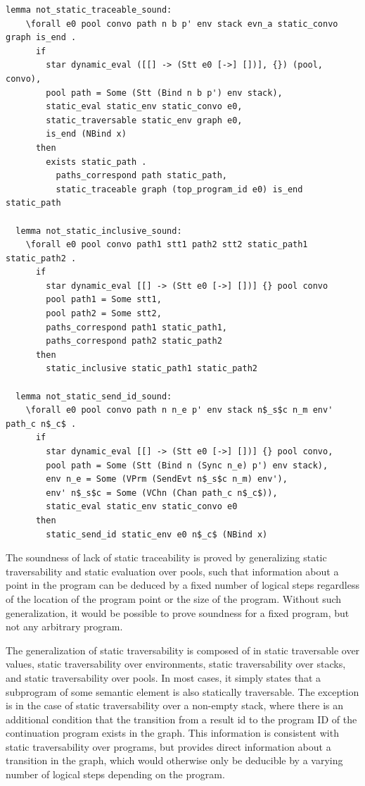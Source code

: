\documentclass[10pt]{article}
\begin{document}
\begin{lstlisting}[language=logic, mathescape]
  lemma not_static_traceable_sound:
    \forall e0 pool convo path n b p' env stack evn_a static_convo graph is_end .
      if
        star dynamic_eval ([[] -> (Stt e0 [->] [])], {}) (pool, convo), 
        pool path = Some (Stt (Bind n b p') env stack),
        static_eval static_env static_convo e0,
        static_traversable static_env graph e0,
        is_end (NBind x)
      then
        exists static_path . 
          paths_correspond path static_path, 
          static_traceable graph (top_program_id e0) is_end static_path

  lemma not_static_inclusive_sound:
    \forall e0 pool convo path1 stt1 path2 stt2 static_path1 static_path2 . 
      if
        star dynamic_eval [[] -> (Stt e0 [->] [])] {} pool convo
        pool path1 = Some stt1, 
        pool path2 = Some stt2, 
        paths_correspond path1 static_path1, 
        paths_correspond path2 static_path2
      then
        static_inclusive static_path1 static_path2

  lemma not_static_send_id_sound:
    \forall e0 pool convo path n n_e p' env stack n$_s$c n_m env' path_c n$_c$ .
      if
        star dynamic_eval [[] -> (Stt e0 [->] [])] {} pool convo, 
        pool path = Some (Stt (Bind n (Sync n_e) p') env stack), 
        env n_e = Some (VPrm (SendEvt n$_s$c n_m) env'), 
        env' n$_s$c = Some (VChn (Chan path_c n$_c$)), 
        static_eval static_env static_convo e0
      then 
        static_send_id static_env e0 n$_c$ (NBind x)
\end{lstlisting}

The soundness of lack of static traceability is proved by generalizing
static traversability and static evaluation over pools, such that information about a point in
the program can be deduced by a fixed number of logical steps regardless of the location of the
program point or the size of the program. Without such generalization, it would be possible to
prove soundness for a fixed program, but not any arbitrary program.

The generalization of static traversability is composed of in static traversable over values,
static traversability over environments, static traversability over stacks, and static
traversability over pools.
In most cases, it simply states that a subprogram of some semantic element is also statically
traversable. The exception is in the case of
static traversability over a non-empty stack, where
there is an additional condition that the transition
from a result id to the program ID
of the continuation program exists in the graph.
This information is consistent with static
traversability over programs, but provides direct information about a transition in the
graph, which would otherwise only be deducible by a varying number of logical steps
depending on the program.
\end{document}
